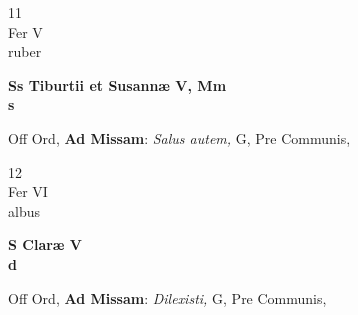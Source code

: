 \documentclass[10pt, openany]{book}
\begin{document}
        \begin{center}
            \begin{minipage}{3.5in}
                \vspace{2em}
                \begin{minipage}{0.5in}
                    {\Huge 11} \\
                    {\normalsize Fer V} \\
                    {\normalsize ruber}
                \end{minipage}
                \begin{minipage}{3.0in}
                    \textbf{ \large Ss Tiburtii et Susannæ V, Mm \\
                    \textnormal{\normalsize s}} \\ 
                \end{minipage}
                \begin{justify}Off Ord, \textbf{Ad Missam}: \textit{Salus autem,} G, Pre Communis,  
                \end{justify}
            \end{minipage}
        \end{center}
    
        \begin{center}
            \begin{minipage}{3.5in}
                \vspace{2em}
                \begin{minipage}{0.5in}
                    {\Huge 12} \\
                    {\normalsize Fer VI} \\
                    {\normalsize albus}
                \end{minipage}
                \begin{minipage}{3.0in}
                    \textbf{ \large S Claræ V \\
                    \textnormal{\normalsize d}} \\ 
                \end{minipage}
                \begin{justify}Off Ord, \textbf{Ad Missam}: \textit{Dilexisti,} G, Pre Communis,  
                \end{justify}
            \end{minipage}
        \end{center}
    
\end{document}
